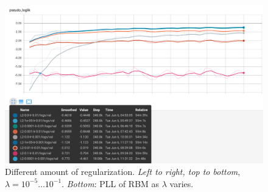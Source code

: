 \begin{figure}[t!]
\begin{mdframed}
\medskip

\includegraphics[width=.9\textwidth]{rbm-mnist/L2_pll.png}
\caption{Different amount of regularization. \emph{Left to right, top to bottom}, $\lambda=10^{-5}\ldots10^{-1}$. \emph{Bottom}: PLL of RBM as $\lambda$ varies.}
\end{mdframed}
\end{figure}

\clearpage

